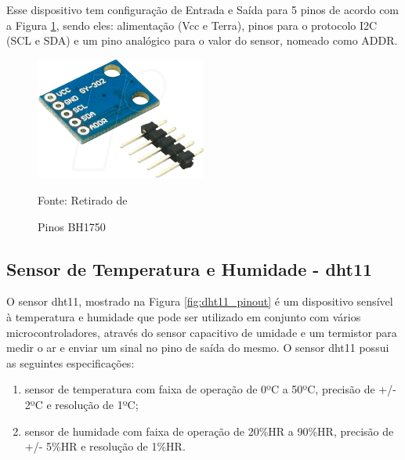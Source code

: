 \documentclass[../../layout.tex]{subfiles}
\begin{document}
\hspace*{3em}Esse dispositivo tem configuração de  Entrada e Saída para 5 pinos de acordo com a Figura \ref{fig:BH1750_pinout}, sendo eles: alimentação (Vcc e Terra), pinos para o protocolo I2C (SCL e SDA) e um pino analógico para o valor do sensor, nomeado como ADDR.

\begin{figure}[H]
\centering
\caption{Pinos BH1750}
\includegraphics[width=0.5\textwidth]{assets/static/img/BH1750_pinout.jpg}
\label{fig:BH1750_pinout}

\begin{minipage}{0.5\textwidth}
\raggedright \footnotesize Fonte: Retirado de \cite{BH1750_shop} 
\end{minipage}
\end{figure}

\subsection{Sensor de Temperatura e Humidade - dht11}
\hspace*{3em}O sensor dht11, mostrado na Figura \ref{fig:dht11_pinout} é um dispositivo sensível à temperatura e humidade que pode ser utilizado em conjunto com vários microcontroladores, através do sensor capacitivo de umidade e um termistor para medir o ar e enviar um sinal no pino de saída do mesmo. O sensor dht11 possui as seguintes especificações:
\begin{enumerate}[label=\alph*)]
\itemsep0em
    \item sensor de temperatura com faixa de operação de 0ºC a 50ºC, precisão de +/- 2ºC e resolução de 1ºC;
    \item sensor de humidade com faixa de operação de 20\%HR a 90\%HR, precisão de +/- 5\%HR e resolução de 1\%HR.
\end{enumerate}
\end{document}
